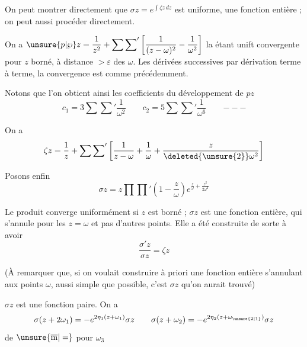 On peut montrer directement que $\sigma z=e^{\int\zeta z\,dz}$ est uniforme,   une fonction entière ;  on peut aussi procéder directement.

On a  $\displaystyle\unsure{p|\wp}z=\frac1{z^2}+\sum{\sum}'\left[\frac1{(z-\omega)^2}-\frac1{\omega^2}\right]$ la  étant unift convergente pour $z$ borné, à distance $>\varepsilon$ des $\omega$. Les dérivées successives  par dérivation terme à terme, la convergence est comme précédemment.

Notons que l'on obtient ainsi les coefficients du développement de $pz$
\[
c_1=3\sum{\sum}'\frac1{\omega^{2}}\qquad c_2=5\sum{\sum}'\frac1{\omega^6}\qquad\mathord{---}
\]

On a
\[
\zeta z=\frac1z+\sum{\sum}'\left[\frac1{z-\omega}+\frac1\omega+\frac{z}{\deleted{\unsure{2}}\omega^2}\right]
\]

Posons enfin
\[
\sigma z=z\prod{\prod}'\left(1-\frac z\omega\right)e^{\frac z\omega+\frac{z^2}{2\omega^2}}
\]

Le produit converge  uniformément  si $z$ est borné ; $\sigma z$ est une fonction entière, qui s'annule pour les $z=\omega$ et pas d'autres points. Elle a été construite de sorte à avoir
\[
\frac{\sigma'z}{\sigma z}=\zeta z
\]

(À remarquer que, si on voulait construire à priori une fonction entière s'annulant aux points $\omega$, aussi simple que possible, c'est $\sigma z$ qu'on aurait trouvé)

$\sigma z$ est une fonction paire. On a
\[
\sigma(z+2\omega_1)=-e^{2\eta_1(z+\omega_1)}\sigma z\qquad
\sigma(z+\omega_2)=-e^{2\eta_2(z+\omega_{\unsure{2|1}})}\sigma z
\]
de $\unsure{\overline{\mathrm m}|=}$ pour $\omega_3$

